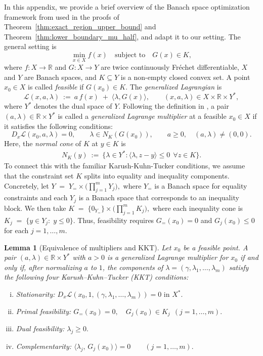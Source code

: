 \documentclass{article}
\newtheorem{lemma}[theorem]{Lemma}
\newcommand{\1}{\mathds{1}}
\newcommand{\R}{\mathbb{R}}
\begin{document}
In this appendix, we provide a brief overview of the Banach space optimization framework from \cite[Ch.~3]{bonnans2013perturbation} used in the proofs of Theorem~\ref{thm:exact_region_upper_bound} and Theorem~\ref{thm:lower_boundary_mu_half}, and adapt it to our setting.
The general setting is
\[
  \min_{x\in X} f(x)
  \quad\text{subject to}\quad
  G(x)\in K,
\]
where $f:X\to\R$ and $G:X\to Y$ are twice continuously Fréchet differentiable, $X$ and $Y$ are Banach spaces, and $K\subseteq Y$ is a non-empty closed convex set.
A point $x_0\in X$ is called \emph{feasible} if $G(x_0)\in K$.
The \emph{generalized Lagrangian} is
\[
  \mathcal{L}(x,a,\lambda)\ :=\ a\,f(x)\;+\;\langle \lambda, G(x)\rangle,
  \qquad (x,a,\lambda)\in X\times \R \times Y^*,
\]
where $Y^*$ denotes the dual space of $Y$.
Following the definition in \cite[Eq.~(3.21)]{bonnans2013perturbation}, a pair $(a,\lambda)\in \R\times Y^*$ is called a \emph{generalized Lagrange multiplier} at a feasible $x_0\in X$ if it satisfies the following conditions:
\begin{equation}\label{eq:BS-condition}
  D_x \mathcal{L}(x_0,a,\lambda)=0,\qquad
  \lambda \in N_K(G(x_0)),\qquad
  a\ge 0,\quad (a,\lambda)\neq (0,0).
\end{equation}
Here, the \emph{normal cone} of $K$ at $y\in K$ is
\begin{align}\label{eq:normal_cone}
  N_K(y)\ :=\ \bigl\{\lambda\in Y^*: \langle \lambda, z-y\rangle \le 0\ \ \forall z\in K\bigr\}.
\end{align}
To connect this with the familiar Karush-Kuhn-Tucker conditions, we assume that the constraint set $K$ splits into equality and inequality components.
Concretely, let
\(
  Y \;=\; Y_= \times \Big(\prod_{j=1}^m Y_j\Big),
\)
where $Y_=$ is a Banach space for equality constraints and each $Y_j$ is a Banach space that corresponds to an inequality block.
We then take
\(
  K \;=\; \{0_{Y_=}\}\times \Big(\prod_{j=1}^m K_j\Big),
\)
where each inequality cone is
\(
  K_j \;=\; \{y\in Y_j:\; y \le 0\}.
\)
Thus, feasibility requires $G_=(x_0)=0$ and $G_j(x_0)\le 0$ for each $j=1,\dots,m$.

\begin{lemma}[Equivalence of multipliers and KKT]\label{lem:KKT}
Let $x_0$ be a feasible point.
A pair $(a, \lambda) \in \mathbb{R} \times Y^*$ with $a>0$ is a generalized Lagrange multiplier for $x_0$ if and only if, after normalizing $a$ to $1$, the components of $\lambda = (\gamma, \lambda_1, \dots, \lambda_m)$ satisfy the following four Karush–Kuhn–Tucker (KKT) conditions:
\begin{enumerate}[(i)]
\item \emph{Stationarity:}
\(
D_x \mathcal{L}(x_0, 1, (\gamma, \lambda_1, \dots, \lambda_m)) = 0 \text{ in } X^*.
\)
\item \emph{Primal feasibility:}
\(
 G_=(x_0)=0,\quad G_j(x_0)\in K_j\ \ (j=1,\dots,m).
\)
\item \emph{Dual feasibility:}
\(
 \lambda_j \ge 0.
\)
\item \emph{Complementarity:}
\(
 \langle \lambda_j,\, G_j(x_0)\rangle=0 \qquad (j=1,\dots,m).
\)
\end{enumerate}
\end{lemma}
\end{document}
